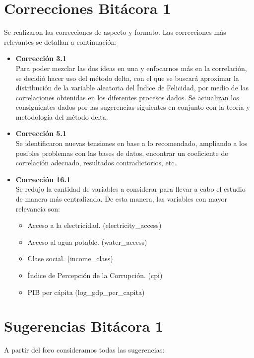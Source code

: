 \section{Correcciones Bitácora 1}
Se realizaron las correcciones de aspecto y formato. Las correcciones más relevantes se detallan a continuación:

\begin{itemize}
    \item \textbf{Corrección 3.1} \\
    Para poder mezclar las dos ideas en una y enfocarnos más en la correlación, se decidió hacer uso del método delta, con el que se buscará aproximar la distribución de la variable aleatoria del Índice de Felicidad, por medio de las correlaciones obtenidas en los diferentes procesos dados. Se actualizan los consiguientes dados por las sugerencias siguientes en conjunto con la teoría y metodología del método delta. 
    
    \item \textbf{Corrección 5.1}\\
    Se identificaron nuevas tensiones en base a lo recomendado, ampliando a los posibles problemas con las bases de datos, encontrar un coeficiente de correlación adecuado, resultados contradictorios, etc.
    
    \item \textbf{Corrección 16.1} \\
    Se redujo la cantidad de variables a considerar para llevar a cabo el estudio de manera más centralizada. De esta manera, las variables con mayor relevancia son:

    \begin{itemize}
        \item Acceso a la electricidad. (electricity\_access)

        \item Acceso al agua potable. (water\_access)

        \item Clase social. (income\_class)

        \item Índice de Percepción de la Corrupción. (cpi)
        
        \item PIB per cápita (log\_gdp\_per\_capita)
    \end{itemize}
    
\end{itemize}

\section{Sugerencias Bitácora 1}
A partir del foro consideramos todas las sugerencias:

